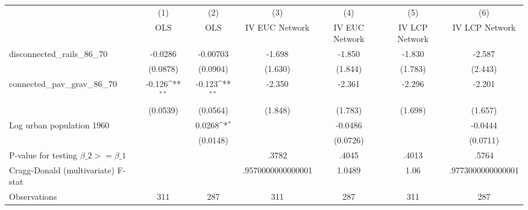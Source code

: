 {
\def\sym#1{\ifmmode^{#1}\else\(^{#1}\)\fi}
\begin{tabular}{l*{6}{c}}
\hline\hline
                &\multicolumn{1}{c}{(1)}&\multicolumn{1}{c}{(2)}&\multicolumn{1}{c}{(3)}&\multicolumn{1}{c}{(4)}&\multicolumn{1}{c}{(5)}&\multicolumn{1}{c}{(6)}\\
                &\multicolumn{1}{c}{OLS}&\multicolumn{1}{c}{OLS}&\multicolumn{1}{c}{IV EUC Network}&\multicolumn{1}{c}{IV EUC Network}&\multicolumn{1}{c}{IV LCP Network}&\multicolumn{1}{c}{IV LCP Network}\\
\hline
disconnected\_rails\_86\_70&  -0.0286         & -0.00703         &   -1.698         &   -1.850         &   -1.830         &   -2.587         \\
                & (0.0878)         & (0.0904)         &  (1.630)         &  (1.844)         &  (1.783)         &  (2.443)         \\
[1em]
connected\_pav\_grav\_86\_70&   -0.126\sym{**} &   -0.123\sym{**} &   -2.350         &   -2.361         &   -2.296         &   -2.201         \\
                & (0.0539)         & (0.0564)         &  (1.848)         &  (1.783)         &  (1.698)         &  (1.657)         \\
[1em]
Log urban population 1960&                  &   0.0268\sym{*}  &                  &  -0.0486         &                  &  -0.0444         \\
                &                  & (0.0148)         &                  & (0.0726)         &                  & (0.0711)         \\
\hline
P-value for testing $\beta\_{2} >= \beta\_{1}$&                  &                  &    .3782         &    .4045         &    .4013         &    .5764         \\
Cragg-Donald (multivariate) F-stat&                  &                  &.9570000000000001         &   1.0489         &     1.06         &.9773000000000001         \\
Observations    &      311         &      287         &      311         &      287         &      311         &      287         \\
\hline\hline
\end{tabular}
}
